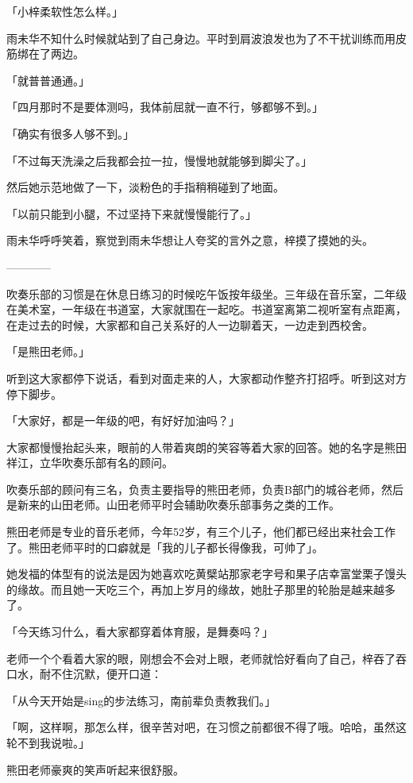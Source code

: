 \documentclass[UTF8]{ctexart}
\begin{document}
    「小梓柔软性怎么样。」

    雨未华不知什么时候就站到了自己身边。平时到肩波浪发也为了不干扰训练而用皮筋绑在了两边。

    「就普普通通。」

    「四月那时不是要体测吗，我体前屈就一直不行，够都够不到。」

    「确实有很多人够不到。」

    「不过每天洗澡之后我都会拉一拉，慢慢地就能够到脚尖了。」

    然后她示范地做了一下，淡粉色的手指稍稍碰到了地面。

    「以前只能到小腿，不过坚持下来就慢慢能行了。」

    雨未华呼呼笑着，察觉到雨未华想让人夸奖的言外之意，梓摸了摸她的头。

    ————

    吹奏乐部的习惯是在休息日练习的时候吃午饭按年级坐。三年级在音乐室，二年级在美术室，一年级在书道室，大家就围在一起吃。书道室离第二视听室有点距离，在走过去的时候，大家都和自己关系好的人一边聊着天，一边走到西校舍。

    「是熊田老师。」

    听到这大家都停下说话，看到对面走来的人，大家都动作整齐打招呼。听到这对方停下脚步。

    「大家好，都是一年级的吧，有好好加油吗？」

    大家都慢慢抬起头来，眼前的人带着爽朗的笑容等着大家的回答。她的名字是熊田祥江，立华吹奏乐部有名的顾问。

    吹奏乐部的顾问有三名，负责主要指导的熊田老师，负责B部门的城谷老师，然后是新来的山田老师。山田老师平时会辅助吹奏乐部事务之类的工作。

    熊田老师是专业的音乐老师，今年52岁，有三个儿子，他们都已经出来社会工作了。熊田老师平时的口癖就是「我的儿子都长得像我，可帅了」。

    她发福的体型有的说法是因为她喜欢吃黄檗站那家老字号和果子店幸富堂栗子馒头的缘故。而且她一天吃三个，再加上岁月的缘故，她肚子那里的轮胎是越来越多了。

    「今天练习什么，看大家都穿着体育服，是舞奏吗？」

    老师一个个看着大家的眼，刚想会不会对上眼，老师就恰好看向了自己，梓吞了吞口水，耐不住沉默，便开口道：

    「从今天开始是sing的步法练习，南前辈负责教我们。」

    「啊，这样啊，那怎么样，很辛苦对吧，在习惯之前都很不得了哦。哈哈，虽然这轮不到我说啦。」

    熊田老师豪爽的笑声听起来很舒服。
\end{document}
